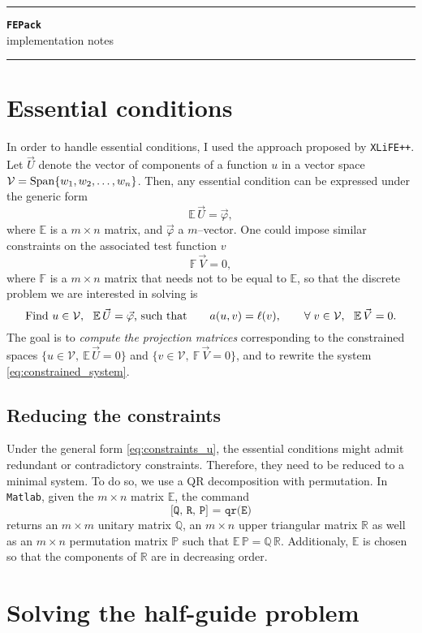 \documentclass[11pt]{article}
\begin{document}
\begin{center}%
%
\rule{\textwidth}{0.0281cm}
\Large \textbf{\texttt{FEPack}}
\\
implementation notes
%
\vspace{-0.5\baselineskip}
\rule{\textwidth}{0.0281cm}
\end{center}

\noindent

\section{Essential conditions}
In order to handle essential conditions, I used the approach proposed by \texttt{XLiFE++}. Let $\vec{U}$ denote the vector of components of a function $u$ in a vector space $\mathcal{V} = \operatorname{Span}\{w_1, w_2,\dots,w_n\}$. Then, any essential condition can be expressed under the generic form
\begin{equation}
  \displaystyle
  \mathbb{E}\, \vec{U} = \vec{\varphi},
  \label{eq:constraints_u}
\end{equation}
where $\mathbb{E}$ is a $m \times n$ matrix, and $\vec{\varphi}$ a $m$--vector. One could impose similar constraints on the associated test function $v$
\begin{equation}
  \displaystyle
  \mathbb{F}\, \vec{V} = 0,
\end{equation}
where $\mathbb{F}$ is a $m \times n$ matrix that needs not to be equal to $\mathbb{E}$, so that the discrete problem we are interested in solving is
\begin{equation}
  \displaystyle
  \textnormal{Find $u \in \mathcal{V},\ \ \mathbb{E}\, \vec{U} = \vec{\varphi}$, such that} \qquad a(u, v) = \ell(v), \qquad \forall\; v \in \mathcal{V},\ \ \mathbb{E}\, \vec{V} = 0.
  \label{eq:constrained_system}
\end{equation}
The goal is to \emph{compute the projection matrices} corresponding to the constrained spaces $\{u \in \mathcal{V},\ \mathbb{E}\, \vec{U} = 0\}$ and $\{v \in \mathcal{V},\ \mathbb{F}\, \vec{V} = 0\}$, and to rewrite the system \eqref{eq:constrained_system}.

\subsection{Reducing the constraints}
Under the general form \eqref{eq:constraints_u}, the essential conditions might admit redundant or contradictory constraints. Therefore, they need to be reduced to a minimal system. To do so, we use a QR decomposition with permutation. In \texttt{Matlab}, given the $m \times n$ matrix $\mathbb{E}$, the command
\[
  \texttt{[Q, R, P] = qr(E)}
\]
returns an $m \times m$ unitary matrix $\mathbb{Q}$, an $m \times n$ upper triangular matrix $\mathbb{R}$ as well as an $m \times n$ permutation matrix $\mathbb{P}$ such that $\mathbb{E}\, \mathbb{P} = \mathbb{Q}\, \mathbb{R}$. Additionaly, $\mathbb{E}$ is chosen so that the components of $\mathbb{R}$ are in decreasing order.


\section{Solving the half-guide problem}   
\end{document}
